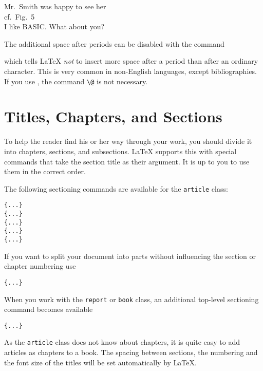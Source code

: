 \begin{example}
Mr.~Smith was happy to see her\\
cf.~Fig.~5\\
I like BASIC\@. What about you?
\end{example}

The additional space after periods can be disabled with the command
\begin{lscommand}
\end{lscommand}
\noindent which tells \LaTeX{} \emph{not} to insert more space after a
period than after an ordinary character. This is very common in
non-English languages, except bibliographies. If you use
, the command \verb|\@| is not necessary.

\section{Titles, Chapters, and Sections}

To help the reader find his or her way through your work, you should
divide it into chapters, sections, and subsections.  \LaTeX{} supports
this with special commands that take the section title as their
argument.  It is up to you to use them in the correct order.

The following sectioning commands are available for the
\texttt{article} class: \nopagebreak

\begin{lscommand}
\verb|{...}|\\
\verb|{...}|\\
\verb|{...}|\\
\verb|{...}|\\
\verb|{...}|
\end{lscommand}

If you want to split your document into parts without influencing the
section or chapter numbering use
\begin{lscommand}
\verb|{...}|
\end{lscommand}

When you work with the \texttt{report} or \texttt{book} class,
an additional top-level sectioning command becomes available
\begin{lscommand}
\verb|{...}|
\end{lscommand}

As the \texttt{article} class does not know about chapters, it is quite easy
to add articles as chapters to a book.
The spacing between sections, the numbering and the font size of the
titles will be set automatically by \LaTeX.

